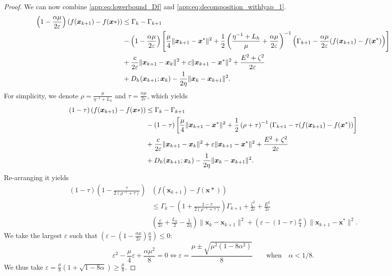 \documentclass[10pt,a4paper]{amsart}
\def\eps{{\varepsilon}}
\def\vx{{\bm{x}}}
\begin{document}
\begin{proof}
We can now combine \cref{app:eq:lowerbound_Df} and \cref{app:eq:decomposition_withlyap_1}.
\begin{align*}
    \left(1 - \frac{\alpha \mu}{2 \eps}\right)\left(f(\vx_{k+1}) - f(\vx*)\right) &\le \Gamma_k - \Gamma_{k+1} \\
    &- \left(1 - \frac{\alpha \mu}{2 \eps}\right) \left[\frac{\mu}{4}\|\vx_{k+1}-\vx^*\|^2 +\frac{1}{2}\left(\frac{\eta^{-1} + L_h}{\mu} + \frac{\alpha \mu}{2 \eps}\right)^{-1}  \left(\Gamma_{k+1} - \frac{\alpha \mu}{2 \eps} (f(\vx_{k+1})-f(\vx^*)\right)\right] \notag\\
    & + \frac{c}{2\eps}\|\vx_{k+1} - \vx_k\|^2 + \eps\|\vx_{k+1}-\vx^*\|^2 +  \frac{E^2 + \zeta^2}{2\eps} \notag\\
    & + D_{h}(\vx_{k+1};\vx_k ) - \frac{1}{2\eta}\|\vx_{k} - \vx_{k+1}\|^2. 
\end{align*}
For simplicity, we denote $\rho = \frac{\mu}{\eta^{-1}  + L_h}$ and $\tau = \frac{\alpha \mu}{2 \eps}$, which yields 
\begin{align*}
    \left(1 - \tau\right)\left(f(\vx_{k+1}) - f(\vx*)\right) &\le \Gamma_k - \Gamma_{k+1} \\
    &- \left(1 - \tau\right) \left[\frac{\mu}{4}\|\vx_{k+1}-\vx^*\|^2 +\frac{1}{2}\left(\rho + \tau\right)^{-1}  \left(\Gamma_{k+1} - \tau (f(\vx_{k+1})-f(\vx^*)\right)\right] \notag\\
    & + \frac{c}{2\eps}\|\vx_{k+1} - \vx_k\|^2 + \eps\|\vx_{k+1}-\vx^*\|^2 +  \frac{E^2 + \zeta^2}{2\eps} \notag\\
    & + D_{h}(\vx_{k+1};\vx_k ) - \frac{1}{2\eta}\|\vx_{k} - \vx_{k+1}\|^2. 
\end{align*}
Re-arranging it yields
\begin{align*}
        \left(1 - \tau\right)\left(1 - \frac{\tau}{2(\rho^{-1} + \tau)}\right)&(f(\vx_{k+1}) - f(\vx*)) \\
        &\le \Gamma_k - \left(1 +  \frac{1-\tau}{2(\rho^{-1} + \tau)}\right)\Gamma_{k+1} + \frac{\zeta^2}{2 \eps} + \frac{E^2}{2\eps}\\
        &  \left( \frac{c}{2\eps} + \frac{L_h}{2} - \frac{1}{2\eta} \right)\|\vx_{k} - \vx_{k+1}\|^2 + \left( \eps - \left(1 - \tau\right) \frac{\mu}{4} \right)\|\vx_{k+1}-\vx^*\|^2.
\end{align*}
We take the largest $\eps$ such that  $(\eps - (1-\frac{\alpha \mu}{2\eps})\frac{\mu}{4}) \le 0$:
\[
\eps^2 - \frac{\mu}{4} \eps +\frac{\alpha \mu^2}{8} = 0 \iff \eps = \frac{\mu \pm \sqrt{\mu^2(1-8\alpha^2)}}{8} \qquad \text{when} \quad \alpha < 1/8.
\]
We thus take $\eps = \frac{ \mu}{8}(1 + \sqrt{1 - 8 \alpha}) \ge \frac{\mu}{8}$.


\end{proof}
\end{document}
